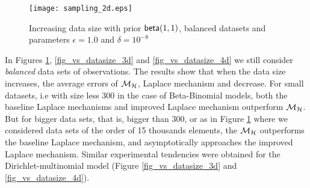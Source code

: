 \documentclass{article}
\begin{document}
\begin{figure}
\begin{center}
\centering
    \texttt{[image: sampling\_2d.eps]}
\caption{Increasing data size with prior $\mathsf{beta}(1,1)$, balanced datasets and parameters $\epsilon = 1.0$ and $\delta = 10^{-8}$}
\label{fig_vs_datasize_2d}
\end{center}
\end{figure}

\begin{figure}[ht]
\begin{center}
\centering
{}
\end{center}
\end{figure}



In Figures \ref{fig_vs_datasize_2d}, \ref{fig_vs_datasize_3d} and \ref{fig_vs_datasize_4d} we still consider \emph{balanced} data sets
of observations. The results show that when the data size increases, the average errors of
$\mathcal{M}_{\mathcal{H}}$, Laplace mechanism and decrease. For small datasets,
i.e with size less $300$ in the case of Beta-Binomial models,
both the baseline Laplace mechanisms and improved Laplace mechanism outperform $\mathcal{M}_{\mathcal{H}}$.
But for bigger data sets, that is, bigger than $300$, or as in Figure \ref{fig_vs_datasize_2d} where
we considered data sets of the order of 15 thousands elements,
the $\mathcal{M}_{\mathcal{H}}$ outperforms the baseline Laplace mechanism, and asymptotically approaches the improved Laplace mechanism.
Similar experimental tendencies were obtained for the Dirichlet-multinomial model (Figure \ref{fig_vs_datasize_3d} and \ref{fig_vs_datasize_4d}).
\end{document}
